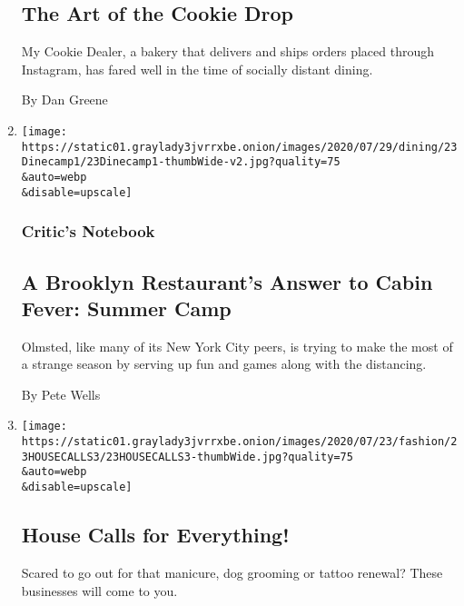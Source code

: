 \begin{enumerate}
  \hypertarget{the-art-of-the-cookie-drop}{%
  \subsection{The Art of the Cookie
  Drop}\label{the-art-of-the-cookie-drop}}

  My Cookie Dealer, a bakery that delivers and ships orders placed
  through Instagram, has fared well in the time of socially distant
  dining.

  By Dan Greene
\item
  \href{/2020/07/23/dining/outdoor-dining-olmsted-summer-camp.html}{}

  \texttt{[image: https://static01.graylady3jvrrxbe.onion/images/2020/07/29/dining/23Dinecamp1/23Dinecamp1-thumbWide-v2.jpg?quality=75\\\&auto=webp\\\&disable=upscale]}

  \hypertarget{critics-notebook}{%
  \subsubsection{Critic's Notebook}\label{critics-notebook}}

  \hypertarget{a-brooklyn-restaurants-answer-to-cabin-fever-summer-camp}{%
  \subsection{A Brooklyn Restaurant's Answer to Cabin Fever: Summer
  Camp}\label{a-brooklyn-restaurants-answer-to-cabin-fever-summer-camp}}

  Olmsted, like many of its New York City peers, is trying to make the
  most of a strange season by serving up fun and games along with the
  distancing.

  By Pete Wells
\item
  \href{/2020/07/23/style/coronavirus-manicures-haircuts-tattoos-dog-groomer-at-home.html}{}

  \texttt{[image: https://static01.graylady3jvrrxbe.onion/images/2020/07/23/fashion/23HOUSECALLS3/23HOUSECALLS3-thumbWide.jpg?quality=75\\\&auto=webp\\\&disable=upscale]}

  \hypertarget{house-calls-for-everything}{%
  \subsection{House Calls for
  Everything!}\label{house-calls-for-everything}}

  Scared to go out for that manicure, dog grooming or tattoo renewal?
  These businesses will come to you.


\end{enumerate}
